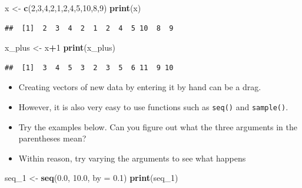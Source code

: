 \documentclass[]{book}
\newenvironment{Shaded}{\begin{snugshade}}{\end{snugshade}}
\newcommand{\DataTypeTok}[1]{\textcolor[rgb]{0.13,0.29,0.53}{#1}}
\newcommand{\DecValTok}[1]{\textcolor[rgb]{0.00,0.00,0.81}{#1}}
\newcommand{\FloatTok}[1]{\textcolor[rgb]{0.00,0.00,0.81}{#1}}
\newcommand{\KeywordTok}[1]{\textcolor[rgb]{0.13,0.29,0.53}{\textbf{#1}}}
\newcommand{\NormalTok}[1]{#1}
\newcommand{\OperatorTok}[1]{\textcolor[rgb]{0.81,0.36,0.00}{\textbf{#1}}}
\newcommand{\StringTok}[1]{\textcolor[rgb]{0.31,0.60,0.02}{#1}}
\begin{document}
\begin{Shaded}
\begin{Highlighting}[]
\NormalTok{x <-}\StringTok{ }\KeywordTok{c}\NormalTok{(}\DecValTok{2}\NormalTok{,}\DecValTok{3}\NormalTok{,}\DecValTok{4}\NormalTok{,}\DecValTok{2}\NormalTok{,}\DecValTok{1}\NormalTok{,}\DecValTok{2}\NormalTok{,}\DecValTok{4}\NormalTok{,}\DecValTok{5}\NormalTok{,}\DecValTok{10}\NormalTok{,}\DecValTok{8}\NormalTok{,}\DecValTok{9}\NormalTok{)}
\KeywordTok{print}\NormalTok{(x)}
\end{Highlighting}
\end{Shaded}

\begin{verbatim}
##  [1]  2  3  4  2  1  2  4  5 10  8  9
\end{verbatim}

\begin{Shaded}
\begin{Highlighting}[]
\NormalTok{x_plus <-}\StringTok{ }\NormalTok{x}\OperatorTok{+}\DecValTok{1}
\KeywordTok{print}\NormalTok{(x_plus)}
\end{Highlighting}
\end{Shaded}

\begin{verbatim}
##  [1]  3  4  5  3  2  3  5  6 11  9 10
\end{verbatim}

\begin{itemize}
\item
  Creating vectors of new data by entering it by hand can be a drag.
\item
  However, it is also very easy to use functions such as \texttt{seq()} and \texttt{sample()}.
\item
  Try the examples below. Can you figure out what the three arguments in the parentheses mean?
\item
  Within reason, try varying the arguments to see what happens
\end{itemize}

\begin{Shaded}
\begin{Highlighting}[]
\NormalTok{seq_}\DecValTok{1}\NormalTok{ <-}\StringTok{ }\KeywordTok{seq}\NormalTok{(}\FloatTok{0.0}\NormalTok{, }\FloatTok{10.0}\NormalTok{, }\DataTypeTok{by =} \FloatTok{0.1}\NormalTok{)}
\KeywordTok{print}\NormalTok{(seq_}\DecValTok{1}\NormalTok{)}
\end{Highlighting}
\end{Shaded}
\end{document}

